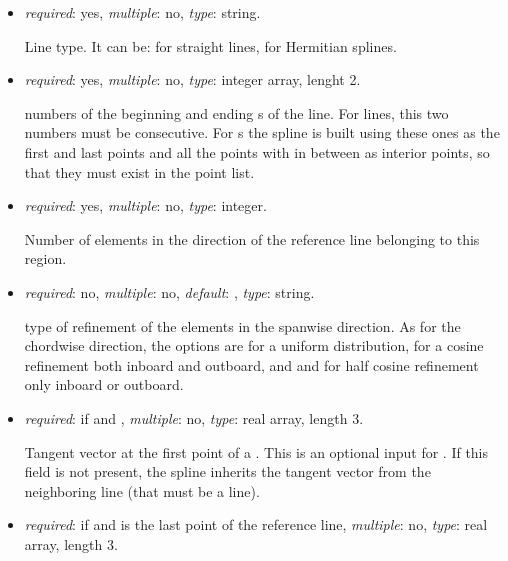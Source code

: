 \begin{itemize}

\item {} \textit{required}: yes, \textit{multiple}: no, \textit{type}: string.

    Line type. It can be:  for straight lines, 
     for Hermitian splines.

\item {}  \textit{required}: yes, \textit{multiple}: no, 
\textit{type}: integer array, lenght 2.

     numbers of the beginning and ending s of the line. 
    For  lines, this two numbers must be consecutive. 
    For s the spline is built using these ones as the first 
    and last points and all the points with  in between as interior 
    points, so that they must exist in the point list.

\item {}  \textit{required}: yes, \textit{multiple}: no, \textit{type}: integer.

    Number of elements in the direction of the reference line belonging 
    to this region.

\item {} \textit{required}: no, \textit{multiple}: no, 
\textit{default}: , \textit{type}: string.

    type of refinement of the elements in the spanwise direction. 
    As for the chordwise direction, the options are  
    for a uniform distribution,  for a cosine refinement 
    both inboard and outboard, and  and  
    for half cosine refinement only inboard or outboard. 
  
\item {} \textit{required}: if  
and , \textit{multiple}: no, 
\textit{type}: real array, length 3. 

    Tangent vector at the first point of a . 
    This is an optional input for . If this field 
    is not present, the spline inherits the tangent vector from the 
    neighboring line (that must be a  line).

\item {} \textit{required}: if  
and  is the last point of the reference line, 
\textit{multiple}: no, \textit{type}: real array, length 3. 


\end{itemize}
